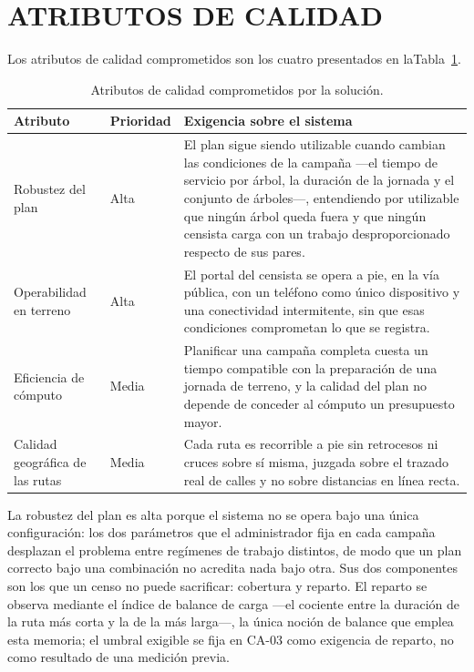 \section{ATRIBUTOS DE CALIDAD}
\label{sec:atributos-calidad}

Los atributos de calidad comprometidos son los cuatro presentados en laTabla~\ref{tab:atributos-calidad}.
\begin{table}[H]
  \centering
  \caption{Atributos de calidad comprometidos por la solución.}
  \label{tab:atributos-calidad}
  \small
  \begin{tabularx}{\textwidth}{@{}p{3.1cm} l X@{}}
    \toprule
    Atributo &
    Prioridad &
    Exigencia sobre el sistema \\
    \midrule
    {\raggedright Robustez del plan\par} &
    Alta &
    El plan sigue siendo utilizable cuando cambian las condiciones de la campaña ---el tiempo de
    servicio por árbol, la duración de la jornada y el conjunto de árboles---, entendiendo por
    utilizable que ningún árbol queda fuera y que ningún censista carga con un trabajo
    desproporcionado respecto de sus pares. \\
    {\raggedright Operabilidad en terreno\par} &
    Alta &
    El portal del censista se opera a pie, en la vía pública, con un teléfono como único dispositivo
    y una conectividad intermitente, sin que esas condiciones comprometan lo que se registra. \\
    {\raggedright Eficiencia de cómputo\par} &
    Media &
    Planificar una campaña completa cuesta un tiempo compatible con la preparación de una jornada de
    terreno, y la calidad del plan no depende de conceder al cómputo un presupuesto mayor. \\
    {\raggedright Calidad geográfica de las rutas\par} &
    Media &
    Cada ruta es recorrible a pie sin retrocesos ni cruces sobre sí misma, juzgada sobre el trazado
    real de calles y no sobre distancias en línea recta. \\
    \bottomrule
  \end{tabularx}
\end{table}

La robustez del plan es alta porque el sistema no se opera bajo una única configuración: los dos
parámetros que el administrador fija en cada campaña desplazan el problema entre regímenes de
trabajo distintos, de modo que un plan correcto bajo una combinación no acredita nada bajo otra.
Sus dos componentes son los que un censo no puede sacrificar: cobertura y reparto. El reparto se
observa mediante el índice de balance de carga ---el cociente entre la duración de la ruta más
corta y la de la más larga---, la única noción de balance que emplea esta memoria; el umbral
exigible se fija en CA-03 como exigencia de reparto, no como resultado de una medición previa.

